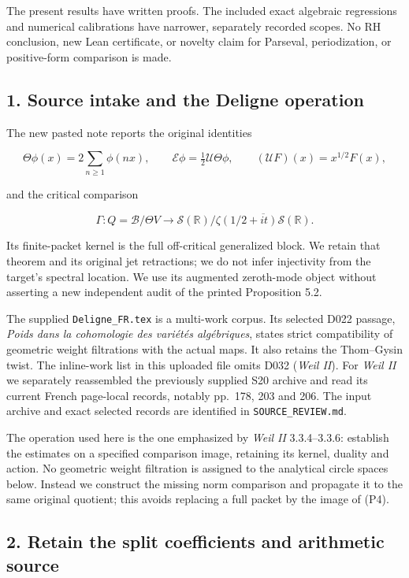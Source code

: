 The present results have written proofs. The included exact algebraic regressions and numerical calibrations have narrower, separately recorded scopes. No RH conclusion, new Lean certificate, or novelty claim for Parseval, periodization, or positive-form comparison is made.

\subsection{1. Source intake and the Deligne operation}\label{endpoint-periodized_original--source-intake-and-the-deligne-operation}

The new pasted note reports the original identities

\[
\Theta\phi(x)=2\sum_{n\ge1}\phi(nx),\qquad
\mathcal E\phi=\tfrac12\mathcal U\Theta\phi,\qquad
(\mathcal UF)(x)=x^{1/2}F(x), \tag{P3}
\]

and the critical comparison

\[
\Gamma:Q=\mathscr B/\Theta V\longrightarrow
\mathcal S(\mathbb R)/\overline{\zeta(1/2+it)\mathcal S(\mathbb R)}.
\tag{P4}
\]

Its finite-packet kernel is the full off-critical generalized block. We retain that theorem and its original jet retractions; we do not infer injectivity from the target's spectral location. We use its augmented zeroth-mode object without asserting a new independent audit of the printed Proposition 5.2.

The supplied \nolinkurl{Deligne_FR.tex} is a multi-work corpus. Its selected D022 passage, \emph{Poids dans la cohomologie des variétés algébriques}, states strict compatibility of geometric weight filtrations with the actual maps. It also retains the Thom--Gysin twist. The inline-work list in this uploaded file omits D032 (\emph{Weil II}). For \emph{Weil II} we separately reassembled the previously supplied S20 archive and read its current French page-local records, notably pp.~178, 203 and 206. The input archive and exact selected records are identified in \nolinkurl{SOURCE_REVIEW.md}.

The operation used here is the one emphasized by \emph{Weil II} 3.3.4--3.3.6: establish the estimates on a specified comparison image, retaining its kernel, duality and action. No geometric weight filtration is assigned to the analytical circle spaces below. Instead we construct the missing norm comparison and propagate it to the same original quotient; this avoids replacing a full packet by the image of (P4).

\subsection{2. Retain the split coefficients and arithmetic source}\label{endpoint-periodized_original--retain-the-split-coefficients-and-arithmetic-source}

